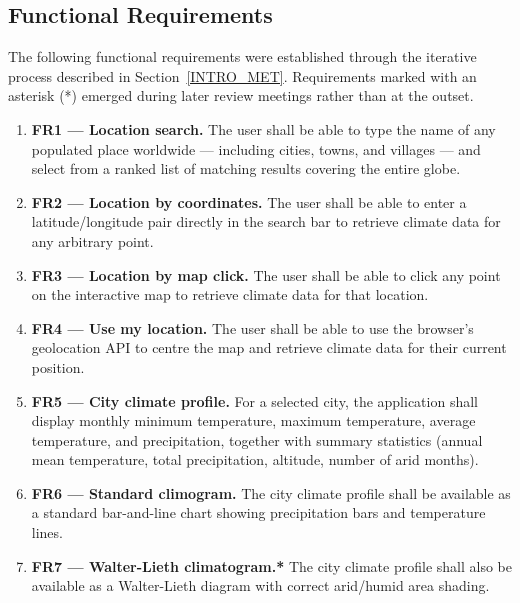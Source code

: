 \subsection{Functional Requirements}\label{APP_REQ_FUNC}

The following functional requirements were established through the iterative
process described in Section~\ref{INTRO_MET}. Requirements marked with an
asterisk (*) emerged during later review meetings rather than at the outset.

\begin{enumerate}
  \item \textbf{FR1 --- Location search.} The user shall be able to type the
    name of any populated place worldwide --- including cities, towns, and
    villages --- and select from a ranked list of matching results covering
    the entire globe.

  \item \textbf{FR2 --- Location by coordinates.} The user shall be able to
    enter a latitude/longitude pair directly in the search bar to retrieve
    climate data for any arbitrary point.

  \item \textbf{FR3 --- Location by map click.} The user shall be able to click
    any point on the interactive map to retrieve climate data for that location.

  \item \textbf{FR4 --- Use my location.} The user shall be able to use the
    browser's geolocation API to centre the map and retrieve climate data for
    their current position.

  \item \textbf{FR5 --- City climate profile.} For a selected city, the
    application shall display monthly minimum temperature, maximum temperature,
    average temperature, and precipitation, together with summary statistics
    (annual mean temperature, total precipitation, altitude, number of arid
    months).

  \item \textbf{FR6 --- Standard climogram.} The city climate profile shall be
    available as a standard bar-and-line chart showing precipitation bars and
    temperature lines.

  \item \textbf{FR7 --- Walter-Lieth climatogram.*} The city climate profile
    shall also be available as a Walter-Lieth diagram with correct arid/humid
    area shading.


\end{enumerate}
